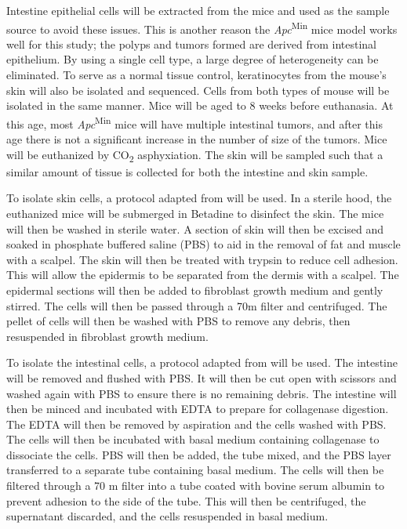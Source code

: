 Intestine epithelial cells will be extracted from the mice and used as the sample source to avoid these issues. This is another reason the \textit{Apc}\textsuperscript{Min} mice model works well for this study; the polyps and tumors formed are derived from intestinal epithelium. By using a single cell type, a large degree of heterogeneity can be eliminated. To serve as a normal tissue control, keratinocytes from the mouse's skin will also be isolated and sequenced. Cells from both types of mouse will be isolated in the same manner. Mice will be aged to 8 weeks before euthanasia. At this age, most \textit{Apc}\textsuperscript{Min} mice will have multiple intestinal tumors, and after this age there is not a significant increase in the number of size of the tumors. Mice will be euthanized by CO\textsubscript{2} asphyxiation. The skin will be sampled such that a similar amount of tissue is collected for both the intestine and skin sample.

To isolate skin cells, a protocol adapted from \cite{jensen_isolation_2013} will be used.
In a sterile hood, the euthanized mice will be submerged in Betadine to disinfect the skin. The mice will then be washed in sterile water. A section of skin will then be excised and soaked in phosphate buffered saline (PBS) to aid in the removal of fat and muscle with a scalpel. The skin will then be treated with trypsin to reduce cell adhesion. This will allow the epidermis to be separated from the dermis with a scalpel. The epidermal sections will then be 
added to fibroblast growth medium and gently stirred. The cells will then be passed through a 70\mu m filter and centrifuged. The pellet of cells will then be washed with PBS to remove any debris, then resuspended in fibroblast growth medium.

To isolate the intestinal cells, a protocol adapted from \cite{orourke_isolation_2016} will be used.
The intestine will be removed and flushed with PBS. It will then be cut open with scissors and washed again with PBS to ensure there is no remaining debris. The intestine will then be minced and incubated with EDTA to prepare for collagenase digestion. The EDTA will then be removed by aspiration and the cells washed with PBS. The cells will then be incubated with basal medium containing collagenase to dissociate the cells. PBS will then be added, the tube mixed, and the PBS layer transferred to a separate tube containing basal medium. The cells will then be filtered through a 70 \mu m filter into a tube coated with bovine serum albumin to prevent adhesion to the side of the tube. This will then be centrifuged, the supernatant discarded, and the cells resuspended in basal medium.

